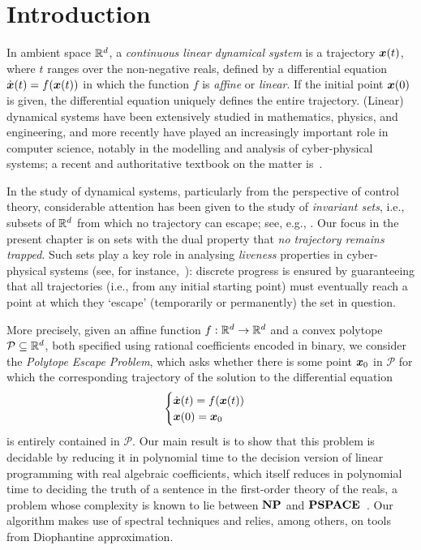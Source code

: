 \section{Introduction}

In ambient space $\mathbb{R}^{d}$, a \emph{continuous linear
  dynamical system} is a trajectory $\boldsymbol{x}(t)$, where $t$
ranges over the non-negative reals, defined by a differential equation
$\dot{\boldsymbol{x}}(t)=f(\boldsymbol{x}(t))$ in which the function
$f$ is \emph{affine} or \emph{linear}. If the initial point
$\boldsymbol{x}(0)$ is given, the differential equation uniquely
defines the entire trajectory. (Linear) dynamical systems have been
extensively studied in mathematics, physics, and engineering, and more
recently have played an increasingly important role in computer
science, notably in the modelling and analysis of cyber-physical
systems; a recent and authoritative textbook on the matter
is~\cite{Alu15}.

In the study of dynamical systems, particularly from the perspective
of control theory, considerable attention has been given to the study
of \emph{invariant sets}, i.e., subsets of $\mathbb{R}^{d}$ from which
no trajectory can escape; see, e.g.,
\cite{CastelanH92,BlondelT00,BM07,SDI08}. Our focus in the present
chapter is on sets with the dual property that \emph{no trajectory
  remains trapped}. Such sets play a key role in analysing
\emph{liveness} properties in cyber-physical systems (see, for
instance,~\cite{Alu15}): discrete progress is ensured by
guaranteeing that all trajectories (i.e., from any initial starting
point) must eventually reach a point at which they `escape'
(temporarily or permanently) the set in question.

More precisely, given an affine function
$f:\mathbb{R}^{d}\rightarrow \mathbb{R}^{d}$ and a convex polytope
$\mathcal{P}\subseteq\mathbb{R}^{d}$, both specified using rational
coefficients encoded in binary, we consider the \emph{Polytope
  Escape Problem}, which asks whether there is some point
$\boldsymbol{x}_0$ in $\mathcal{P}$ for which the corresponding
trajectory of the solution to the differential equation
\begin{equation*}
\begin{displaystyle} \begin{cases}
\dot{\myvector{x}}(t)=f(\myvector{x}(t)) \\
\myvector{x}(0)=\myvector{x}_{0}
\end{cases} \end{displaystyle}
\end{equation*}
is entirely contained in $\mathcal{P}$. Our main result is to show
that this problem is decidable by reducing it in polynomial time to
the decision version of linear programming with real algebraic
coefficients, which itself reduces in polynomial time to deciding the
truth of a sentence in the first-order theory of the reals, a problem
whose complexity is known to lie between $\textbf{NP}$ and
$\textbf{PSPACE}$~\cite{Canny88}. Our algorithm makes use of spectral
techniques and relies, among others, on tools from Diophantine
approximation.

